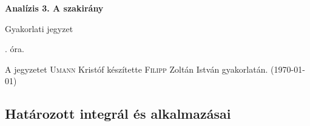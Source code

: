 \documentclass[a4paper,11.5pt]{article}
\begin{document}
	\setlength\parindent{0pt}
	\def\a{\textbf{a}}
	\def\b{\textbf{b}}
	\def\N{\hskip 10 true mm}
	\def\a{\textbf{a}}
	\def\b{\textbf{b}}
	\def\c{\textbf{c}}
	\def\d{\textbf{d}}
	\def\e{\textbf{e}}
	\def\gg{$\gamma$}
	\def\vi{\textbf{i}}
	\def\jj{\textbf{j}}
	\def\kk{\textbf{k}}
	\def\fh{\overrightarrow}
	\def\l{\lambda}
	\def\m{\mu}
	\def\v{\textbf{v}}
	\def\0{\textbf{0}}
	\def\s{\hspace{0.2mm}\vphantom{\beta}}
	\def\Z{\mathbb{Z}}
	\def\Q{\mathbb{Q}}
	\def\R{\mathbb{R}}
	\def\C{\mathbb{C}}
	\def\N{\mathbb{N}}
	\def\Rn{\mathbb{R}^{n}}
	\def\Ra{\overline{\mathbb{R}}}
	\def\sume{\displaystyle\sum_{n=1}^{+\infty}}
	\def\sumn{\displaystyle\sum_{n=0}^{+\infty}}
	\def\biz{\emph{Bizonyítás:\ }}
	\def\narrow{\underset{n\rightarrow+\infty}{\longrightarrow}}
	\def\limn{\displaystyle\lim_{n\to +\infty}}
	
	\theoremstyle{definition}
	\newtheorem{theorem}{Tétel}[subsubsection] %
	
	\theoremstyle{definition}
	\newtheorem{definition}[theorem]{Definíció} %
	\newtheorem{example}[theorem]{Példa} %
	\newtheorem{exercise}[theorem]{Házi feladat} %
	\newtheorem{note}[theorem]{Megjegyzés} %
	\newtheorem{task}[theorem]{Feladat} %
	\newtheorem{revision}[theorem]{Emlékeztető} %
	\begin{center}
		{\LARGE\textbf{Analízis 3. A szakirány}}
		\smallskip
		
		{\Large Gyakorlati jegyzet}
		
		. óra.
	\end{center}
	A jegyzetet \textsc{Umann} Kristóf készítette \textsc{Filipp} Zoltán István gyakorlatán. (\today)
	\subsection{Határozott integrál és alkalmazásai}
\end{document}
